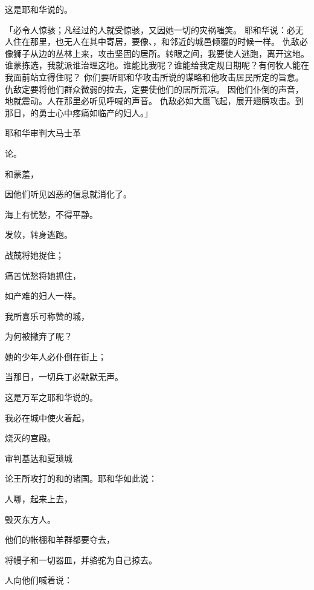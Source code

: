 {\par }{\Q 这是耶和华说的。
\par }{\PP {}「{}必令人惊骇；凡经过的人就受惊骇，又因她一切的灾祸嗤笑。
耶和华说：必无人住在那里，也无人在其中寄居，要像{}、{}，和邻近的城邑倾覆的时候一样。
仇敌必像狮子从{}边的丛林上来，攻击坚固的居所。转眼之间，我要使{}人逃跑，离开这地。谁蒙拣选，我就派谁治理这地。谁能比我呢？谁能给我定规日期呢？有何牧人能在我面前站立得住呢？
你们要听耶和华攻击{}所说的谋略和他攻击{}居民所定的旨意。仇敌定要将他们群众微弱的拉去，定要使他们的居所荒凉。
因他们仆倒的声音，地就震动。人在{}那里必听见呼喊的声音。
仇敌必如大鹰飞起，展开翅膀攻击{}。到那日，{}的勇士心中疼痛如临产的妇人。」
\par }{\SH 耶和华审判大马士革
\par }{\Q {}论{}。
\par }{和{}蒙羞，
\par }{\Q 因他们听见凶恶的信息就消化了。
\par }{\Q 海上有忧愁，不得平静。
\par }{\Q {}发软，转身逃跑。
\par }{\Q 战兢将她捉住；
\par }{\Q 痛苦忧愁将她抓住，
\par }{\Q 如产难的妇人一样。
\par }{\Q {}我所喜乐可称赞的城，
\par }{\Q 为何被撇弃了呢？
\par }{\Q {}她的少年人必仆倒在街上；
\par }{\Q 当那日，一切兵丁必默默无声。
\par }{\Q 这是万军之耶和华说的。
\par }{\Q {}我必在{}城中使火着起，
\par }{\Q 烧灭{}的宫殿。
\par }{\SH 审判基达和夏琐城
\par }{\PP {}论{}王{}所攻打的{}和{}的诸国。耶和华如此说：
\par }{人哪，起来上{}去，
\par }{\Q 毁灭东方人。
\par }{\Q {}他们的帐棚和羊群都要夺去，
\par }{\Q 将幔子和一切器皿，并骆驼为自己掠去。
\par }{\Q 人向他们喊着说：
}
